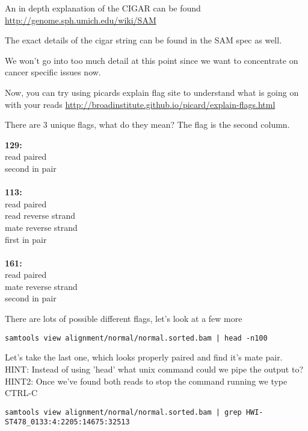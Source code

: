 An in depth explanation of the CIGAR can be found \url{http://genome.sph.umich.edu/wiki/SAM}

The exact details of the cigar string can be found in the SAM spec as well.


We won't go into too much detail at this point since we want to concentrate on cancer specific issues now.


Now, you can try using picards explain flag site to understand what is going on with your reads
\url{http://broadinstitute.github.io/picard/explain-flags.html}

\begin{questions} 
There are 3 unique flags, what do they mean? The flag is the second column.
\end{questions}
\begin{answer}
\textbf{129:}\\ 
    read paired\\
    second in pair\\ \\
\textbf{113:}\\
    read paired\\
    read reverse strand\\
    mate reverse strand\\
    first in pair\\ \\
\textbf{161:}\\
    read paired\\
    mate reverse strand\\
    second in pair\\
\end{answer}

There are lots of possible different flags, let's look at a few more
\begin{lstlisting}
samtools view alignment/normal/normal.sorted.bam | head -n100
\end{lstlisting}


\begin{questions} 
Let's take the last one, which looks properly paired and find it's mate pair. \\
HINT: Instead of using 'head' what unix command could we pipe the output to?
HINT2: Once we've found both reads to stop the command running we type CTRL-C
\end{questions}
\begin{answer}
\begin{lstlisting}
samtools view alignment/normal/normal.sorted.bam | grep HWI-ST478_0133:4:2205:14675:32513
\end{lstlisting}
\end{answer}

